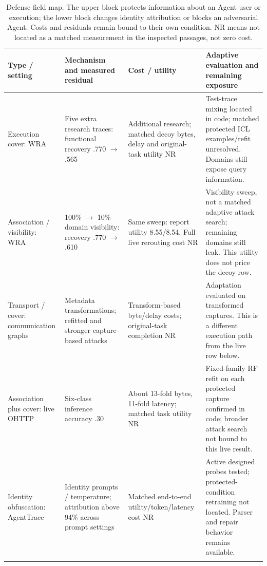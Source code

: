 \begin{table}[t]\centering\small
\caption{Defense field map. The upper block protects information about an Agent user or execution; the lower block changes identity attribution or blocks an adversarial Agent. Costs and residuals remain bound to their own condition. NR means not located as a matched measurement in the inspected passages, not zero cost.}
\label{tab:defenses}
\setlength{\tabcolsep}{4pt}
\begin{tabularx}{\textwidth}{@{}P{.19\textwidth}P{.22\textwidth}P{.19\textwidth}Y@{}}\toprule
Type / setting & Mechanism and measured residual & Cost / utility & Adaptive evaluation and remaining exposure \\\midrule
Execution cover: WRA~\cite[Sec.~8.1]{jeong2026wra} & Five extra research traces: functional recovery .770 $\to$ .565 & Additional research; matched decoy bytes, delay and original-task utility NR & Test-trace mixing located in code; matched protected ICL examples/refit unresolved. Domains still expose query information. \\\addlinespace[3pt]
Association / visibility: WRA~\cite[Sec.~8.2]{jeong2026wra} & 100\% $\to$ 10\% domain visibility: recovery .770 $\to$ .610 & Same sweep: report utility 8.55/8.54. Full live rerouting cost NR & Visibility sweep, not a matched adaptive attack search; remaining domains still leak. This utility does not price the decoy row. \\\addlinespace[3pt]
Transport / cover: communication graphs~\cite[Secs.~9.3,9.8]{dangol2026workflow} & Metadata transformations; refitted and stronger capture-based attacks & Transform-based byte/delay costs; original-task completion NR & Adaptation evaluated on transformed captures. This is a different execution path from the live row below. \\\addlinespace[3pt]
Association plus cover: live OHTTP~\cite[Sec.~9.7]{dangol2026workflow} & Six-class inference accuracy .30 & About 13-fold bytes, 11-fold latency; matched task utility NR & Fixed-family RF refit on each protected capture confirmed in code; broader attack search not bound to this live result. \\\midrule
Identity obfuscation: AgentTrace~\cite[Sec.~4.4]{zhao2026agenttrace} & Identity prompts / temperature; attribution above 94\% across prompt settings & Matched end-to-end utility/token/latency cost NR & Active designed probes tested; protected-condition retraining not located. Parser and repair behavior remains available. \\\addlinespace[3pt]

\end{tabularx}
\end{table}
